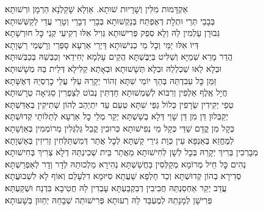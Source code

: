 \begin{footnotesize}

\shatz
אַקְדָּמוּת מִלִּין וְשָׁרָיוּת שׁוּתָא. אַוְלָא שָׁקֵלְנָא הַרְמָן וּרְשׁוּתָא׃\\
\kahal
בְּבָבֵי תְּרֵי וּתְלָת דְאֶפְתַּח בְּנַקְשׁוּתָא בְּבָרֵי דְבָרֵי וְטָרֵי עֲדֵי לְקַשְּׁשׁוּתָא׃\\
\shatz
גְּבוּרָן עָלְמִין לֵהּ וְלָא סְפֵק פְּרִישׁוּתָא גְּוִיל אִלּוּ רְקִיעֵי קְנֵי כׇּל חוּרְשָׁתָא׃\\
\kahal
דְּיוֹ אִלּוּ יַמֵּי וְכׇל מֵי כְנִישׁוּתָא דָּיְרֵי אַרְעָא סָפְרֵי וְרָשְׁמֵי רַשְׁוָתָא׃\\
\shatz
הֲדַר מָרֵא שְׁמַיָּא וְשַׁלִּיט בְּיַבֶּשְׁתָּא הֲקֵים עָלְמָא יְחִידַאי וְכַבְּשֵׁהּ בְּכַבְּשׁוּתָא׃\\
\kahal
וּבְלָא לֵאוּ שַׁכְלְלֵהּ וּבְלָא תְּשָׁשׁוּתָא וּבְאָתָא קַלִּילָא דְּלֵית בַּהּ מְשָׁשׁוּתָא׃\\
\shatz
זַמֵּן כׇּל עַבִדְתֵּהּ בְּהַךְ יוֹמֵי שִׁתָּא זְהוֹר יְקָרֵהּ עַלִּי עֲלֵי כׇרְסְיֵהּ דְּאֶשָּׁתָא׃\\
\kahal
חֲיָל אֶֽלֶף אַלְפִין וְרִבּוֹא לְשַׁמְשׁוּתָא חַדְתִּין נְבוֹט לְצַפְרִין סַגִּיאָה טְרָשׁוּתָא׃\\
\shatz
טְפֵי יְקִידִין שְׂרָפִין כְּלוֹל גַפֵּי שִׁתָּא טְעֵם עַד יִתְיְהֵב לְהוֹן שְׁתִיקִין בְּאַדִּשְׁתָּא׃\\
\kahal
יְקַבְּלוּן דֵּן מִן דֵּן שָׁוֵי דְּלָא בְשַׁשְׁתָּא יְקַר מְלֵי כׇל אַרְעָא לְתַלּוֹתֵי קְדוּשְׁתָּא׃\\
\shatz
כְּקָל מִן קֳדָם שַׁדַּי כְּקָל מֵי נְפִישׁוּתָא כְּרוּבִין קֳבֵל גַּלְגְּלִין מְרוֹמְמִין בְּאַוְשָׁתָא׃\\
\kahal
לְמֶחֱזֵא בְּאַנְפָּא עֵין כְּוָת גִּירֵי קַשְׁתָּא לְכׇל אֲתַר דְּמִשְׁתַּלְּחִין זְרִיזִין בְּאַשְׁוָתָא׃\\
\shatz
מְבָרְכִין בְּרִיךְ יְקָרֵהּ בְּכׇל לְשָׁן לְחִישׁוּתָא מֵאֲתַר בֵּית שְׁכִינְתֵּהּ דְלָא צְרִיךְ בְּחִישׁוּתָא׃\\
\kahal
נְהִים כׇּל חֵיל מְרוֹמָא מְקַלְּסִין בַּחֲשַׁשְׁתָּא נְהִירָא מַלְכוּתֵהּ לְדָר וְדָר לְאַפְרַשְׁתָּא׃\\
\shatz
סְדִירָא בְהוֹן קְדוּשְׁתָּא וְכַד חָלְפָא שַׁעֲתָא סִיּוּמָא דִלְעָלַם וְאוֹף לָא לִשְׁבוּעֲתָא׃\\
\kahal
עֲדַב יְקַר אַחְסַנְתֵּהּ חֲבִיבִין דְבִקְבַעְתָּא עָבְדִין לֵהּ חֲטִיבָא בִּדְנַח וּשְׁקַעְתָּא׃\\
\shatz
פְּרִישָׁן לְמָנָתֵהּ לְמֶעְבַּד לֵהּ רְעוּתָא פְּרִישׁוּתֵה שְׁבָחֵהּ יְחַוּוּן בְּשָׁעוּתָא׃\\

\end{footnotesize}
